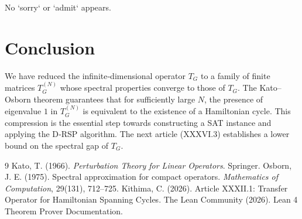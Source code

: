 \documentclass[11pt,a4paper]{article}
\begin{document}
No `sorry` or `admit` appears.

\section{Conclusion}

We have reduced the infinite‑dimensional operator \(T_G\) to a family of finite matrices \(T_G^{(N)}\) whose spectral properties converge to those of \(T_G\). The Kato–Osborn theorem guarantees that for sufficiently large \(N\), the presence of eigenvalue \(1\) in \(T_G^{(N)}\) is equivalent to the existence of a Hamiltonian cycle. This compression is the essential step towards constructing a SAT instance and applying the D‑RSP algorithm. The next article (XXXVI.3) establishes a lower bound on the spectral gap of \(T_G\).


\begin{thebibliography}{9}
  Kato, T. (1966). \emph{Perturbation Theory for Linear Operators}. Springer.
  Osborn, J. E. (1975). Spectral approximation for compact operators. \emph{Mathematics of Computation}, 29(131), 712–725.
  Kithima, C. (2026). Article XXXII.1: Transfer Operator for Hamiltonian Spanning Cycles.
  The Lean Community (2026). Lean 4 Theorem Prover Documentation.
\end{thebibliography}
\end{document}
